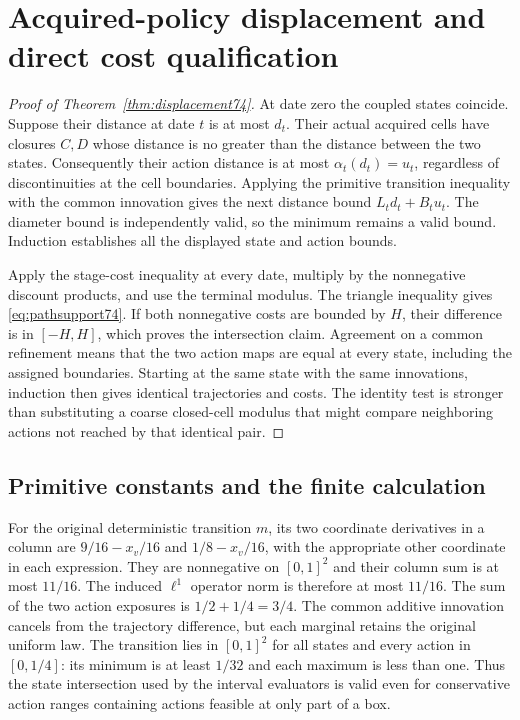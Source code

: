 \section{Acquired-policy displacement and direct cost qualification}\label{supp:cost74}
\begin{proof}[Proof of Theorem~\ref{thm:displacement74}]
At date zero the coupled states coincide. Suppose their distance at date $t$ is at most $d_t$. Their actual acquired cells have closures $C,D$ whose distance is no greater than the distance between the two states. Consequently their action distance is at most $\alpha_t(d_t)=u_t$, regardless of discontinuities at the cell boundaries. Applying the primitive transition inequality with the common innovation gives the next distance bound $L_td_t+B_tu_t$. The diameter bound is independently valid, so the minimum remains a valid bound. Induction establishes all the displayed state and action bounds.

Apply the stage-cost inequality at every date, multiply by the nonnegative discount products, and use the terminal modulus. The triangle inequality gives \eqref{eq:pathsupport74}. If both nonnegative costs are bounded by $H$, their difference is in $[-H,H]$, which proves the intersection claim. Agreement on a common refinement means that the two action maps are equal at every state, including the assigned boundaries. Starting at the same state with the same innovations, induction then gives identical trajectories and costs. The identity test is stronger than substituting a coarse closed-cell modulus that might compare neighboring actions not reached by that identical pair.
\end{proof}

\subsection{Primitive constants and the finite calculation}
For the original deterministic transition $m$, its two coordinate derivatives in a column are $9/16-x_v/16$ and $1/8-x_v/16$, with the appropriate other coordinate in each expression. They are nonnegative on $[0,1]^2$ and their column sum is at most $11/16$. The induced $\ell^1$ operator norm is therefore at most $11/16$. The sum of the two action exposures is $1/2+1/4=3/4$. The common additive innovation cancels from the trajectory difference, but each marginal retains the original uniform law. The transition lies in $[0,1]^2$ for all states and every action in $[0,1/4]$: its minimum is at least $1/32$ and each maximum is less than one. Thus the state intersection used by the interval evaluators is valid even for conservative action ranges containing actions feasible at only part of a box.

